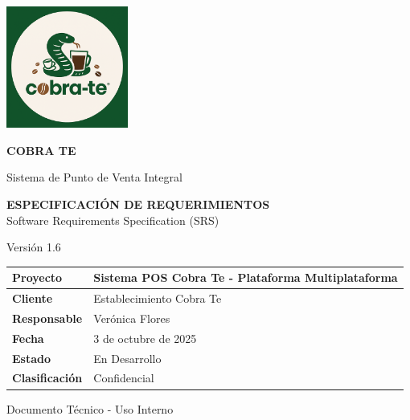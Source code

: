 \documentclass[12pt,letterpaper]{article}
\begin{document}
\begin{titlepage}
    \centering
    \vspace*{1cm}
    
    \includegraphics[width=4cm]{Logo.png}
    
    \vspace{1cm}
    {\color{cobrablue}\Huge\textbf{COBRA TE}}
    
    \vspace{0.5cm}
    {\color{cobraorange}\Large Sistema de Punto de Venta Integral}
    
    \vspace{2cm}
    {\color{cobragray}\LARGE\textbf{ESPECIFICACIÓN DE REQUERIMIENTOS}}
    {\color{cobragray}\large\\ Software Requirements Specification (SRS)}
    
    \vspace{1cm}
    {\color{cobragray}\large Versión 1.6}
    
    \vspace{2cm}
    \begin{tabular}{|p{4cm}|p{8cm}|}
        \hline
        \rowcolor{cobrablue!20}
        \textbf{Proyecto} & Sistema POS Cobra Te - Plataforma Multiplataforma \\
        \hline
        \textbf{Cliente} & Establecimiento Cobra Te \\
        \hline
        \textbf{Responsable} & Verónica Flores \\
        \hline
        \textbf{Fecha} & 3 de octubre de 2025 \\
        \hline
        \textbf{Estado} & En Desarrollo \\
        \hline
        \textbf{Clasificación} & Confidencial \\
        \hline
    \end{tabular}
    
    \vfill
    {\color{cobragray}\large Documento Técnico - Uso Interno}
    
\end{titlepage}
\end{document}
